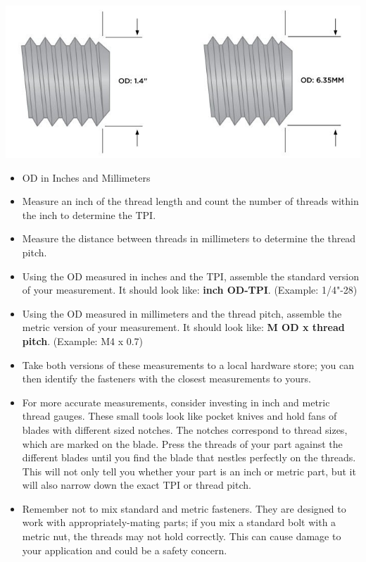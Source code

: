 \documentclass[12pt, a4paper]{article}
\providecommand{\tightlist}{%
	\setlength{\itemsep}{0pt}\setlength{\parskip}{0pt}}
\providecommand{\tightlist}{%
	\setlength{\itemsep}{0pt}\setlength{\parskip}{0pt}}
\begin{document}
		\includegraphics{Introduction to Nut and Bolt Sizes_files/6307ba3bb06ad783039359.jpg}
		
		\begin{itemize}
			\tightlist
			\item
			OD in Inches and Millimeters
			\item
			Measure an inch of the thread length and count the number of threads
			within the inch to determine the TPI.
			\item
			Measure the distance between threads in millimeters to determine the
			thread pitch.
			\item
			Using the OD measured in inches and the TPI, assemble the standard
			version of your measurement. It should look like: \textbf{inch
				OD-TPI}. (Example: 1/4"-28)
			\item
			Using the OD measured in millimeters and the thread pitch, assemble
			the metric version of your measurement. It should look like: \textbf{M
				OD x thread pitch}. (Example: M4 x 0.7)
			\item
			Take both versions of these measurements to a local hardware store;
			you can then identify the fasteners with the closest measurements to
			yours.
			\item
			For more accurate measurements, consider investing in inch and metric
			thread gauges. These small tools look like pocket knives and hold fans
			of blades with different sized notches. The notches correspond to
			thread sizes, which are marked on the blade. Press the threads of your
			part against the different blades until you find the blade that
			nestles perfectly on the threads. This will not only tell you whether
			your part is an inch or metric part, but it will also narrow down the
			exact TPI or thread pitch.
			\item
			Remember not to mix standard and metric fasteners. They are designed
			to work with appropriately-mating parts; if you mix a standard bolt
			with a metric nut, the threads may not hold correctly. This can cause
			damage to your application and could be a safety concern.
		\end{itemize}
		
\end{document}
